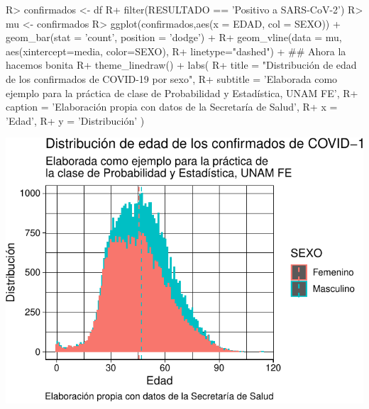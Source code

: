 \documentclass[
]{jss}
\begin{document}
\begin{CodeChunk}

\begin{CodeInput}
R> confirmados <- df %
R+   filter(RESULTADO == 'Positivo a SARS-CoV-2')
R> mu <- confirmados %
R> ggplot(confirmados,aes(x = EDAD, col = SEXO)) + geom_bar(stat = 'count', position = 'dodge') +
R+    geom_vline(data = mu, aes(xintercept=media, color=SEXO),
R+              linetype="dashed") + ## Ahora la hacemos bonita
R+   theme_linedraw() + labs(
R+     title = "Distribución de edad de los confirmados de COVID-19 por sexo",
R+     subtitle = 'Elaborada como ejemplo para la práctica de \nla clase de Probabilidad y Estadística, UNAM FE',
R+     caption = 'Elaboración propia con datos de la Secretaría de Salud',
R+     x = 'Edad',
R+     y = 'Distribución' )
\end{CodeInput}


\begin{center}\includegraphics{PracticaFinal_files/figure-latex/unnamed-chunk-4-1} \end{center}

\end{CodeChunk}
\end{document}
